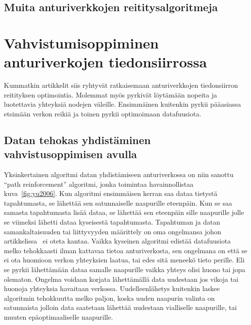 \subsection{Muita anturiverkkojen reititysalgoritmeja}

\section{Vahvistumisoppiminen anturiverkojen tiedonsiirrossa}

Kummatkin artikkelit siis ryhtyvät ratkaisemaan anturiverkkojen tiedonsiirron
reitityksen optimointia. Molemmat myös pyrkivät löytämään nopeita ja
luotettavia yhteyksiä nodejen väleille. Ensimmäinen kuitenkin pyrkii pääasiassa
etsimään verkon reikiä ja toinen pyrkii optimoimaan datafuusiota.


\subsection{Datan tehokas yhdistäminen vahvistusoppimisen avulla}

Yksinkertainen algoritmi datan yhdistämiseen anturiverkossa on niin sanottu
``path reinforcement'' algoritmi, jonka toimintaa havainnollistaa
kuva~\ref{fig:yu2006}. Kun algoritmi ensimmäisen kerran saa dataa tietystä
tapahtumasta, se lähettää sen satunnaiselle naapurille eteenpäin. Kun se saa
samasta tapahtumasta lisää dataa, se lähettää sen eteenpäin sille naapurille
jolle se viimeksi lähetti dataa kyseisestä tapahtumasta.  Tapahtuman ja datan
samankaltaisuuden tai liittyvyyden määrittely on oma ongelmansa johon
artikkelissa~\cite{Yu2006} ei oteta kantaa. Vaikka kyseinen algoritmi edistää
datafuusiota melko tehokkaasti ilman kattavaa tietoa anturiverkosta, sen
ongelmana on että se ei ota huomioon verkon yhteyksien laatua, tai edes sitä
meneekö tieto perille. Eli se pyrkii lähettämään dataa samalle naapurille
vaikka yhteys olisi huono tai jopa olematon. Ongelma voidaan korjata
lähettämällä data uudestaan jos vikoja tai huonoja yhteyksia havaitaan
verkossa. Uudelleenlähetys kuitenkin laskee algoritmin tehokkuutta melko
paljon, koska uuden naapurin valinta on satunnaista jolloin data saatetaan
lähettää uudestaan vialliselle naapurille, tai muuten epäoptimaaliselle
naapurille.

